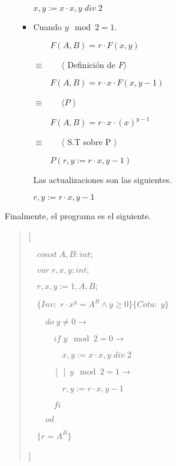 \documentclass[hidelinks]{article}
\newenvironment{absolutelynopagebreak}
{\Needspace{10\baselineskip}\begin{quote}}
		{\end{quote}}
\begin{document}
\begin{enumerate}
\begin{itemize}
\begin{itemize}
			                  \begin{center}
				                  $x,y := x \cdot x, y \; div \; 2$\par
			                  \end{center}
			            \item Cuando $y \mod 2 = 1$.\par
			                  $\qquad F(A,B) = r \cdot F(x,y)$\par
			                  $\equiv \qquad \langle $ Definición de $ F \rangle$\par
			                  $\qquad F(A,B) = r \cdot x \cdot F(x, y - 1)$\par
			                  $\equiv \qquad \langle P$  $\rangle$\par
			                  $\qquad F(A,B) = r \cdot x \cdot (x)^{y-1}$\par
			                  $\equiv \qquad \langle $ S.T sobre P $\rangle$\par
			                  $\qquad P(r,y := r \cdot x, y - 1)$\par
			                  Las actualizaciones son las siguientes.\par

			                  \begin{center}
				                  $r,y := r \cdot x, y - 1$\par
			                  \end{center}
		            \end{itemize}
	      \end{itemize}

	      Finalmente, el programa es el siguiente.\par

	      \begin{absolutelynopagebreak}
		      [\par
			      $\quad const \; A, B: int;$\par
			      $\quad var \; r, x, y : int;$\par
			      $\quad r, x, y := 1, A, B;$\par
			      $\quad \{Inv:\; r \cdot x^y = A^B \land y \geq 0\}\{Cota: \; y\}$ \par
			      $\qquad do \; y \neq 0 \rightarrow$ \par
			      $\qquad \quad if \; y \mod 2 = 0 \rightarrow$ \par
			      $\qquad \quad \quad x, y := x \cdot x, y \; div \; 2$ \par
			      $\qquad \quad [\;] \; y \mod 2 = 1 \rightarrow$ \par
			      $\qquad \quad \quad r, y := r \cdot x, y - 1$ \par
			      $\qquad \quad fi$ \par
			      $\qquad od$ \par
			      $\quad \{r =A^B\}$ \par
		      ]\par
	      \end{absolutelynopagebreak}\par

\end{enumerate}
\end{document}
